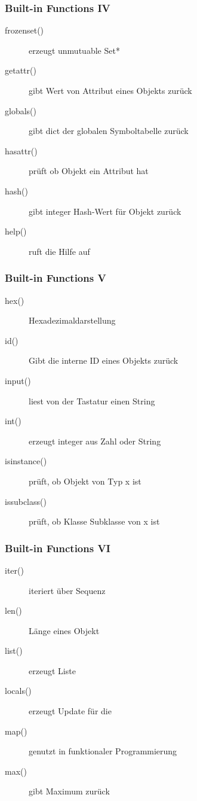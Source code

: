 \documentclass[ngerman]{beamer}
\begin{document}
\begin{frame}
\frametitle{Built-in Functions IV}

\begin{description}
\item[frozenset()] erzeugt unmutuable Set*
\item[getattr()] gibt Wert von Attribut eines Objekts zurück
\item[globals()] gibt dict der globalen Symboltabelle zurück
\item[hasattr()] prüft ob Objekt ein Attribut hat
\item[hash()] gibt integer Hash-Wert für Objekt zurück
\item[help()] ruft die Hilfe auf
\end{description}
\end{frame}


\begin{frame}
\frametitle{Built-in Functions V}

\begin{description}
\item[hex()] Hexadezimaldarstellung
\item[id()] Gibt die interne ID eines Objekts zurück
\item[input()] liest von der Tastatur einen String
\item[int()] erzeugt integer aus Zahl oder String
\item[isinstance()] prüft, ob Objekt von Typ x ist
\item[issubclass()] prüft, ob Klasse Subklasse von x ist
\end{description}
\end{frame}


\begin{frame}
\frametitle{Built-in Functions VI}

\begin{description}
\item[iter()] iteriert über Sequenz
\item[len()] Länge eines Objekt
\item[list()] erzeugt Liste
\item[locals()] erzeugt Update für die 
\item[map()] genutzt in funktionaler Programmierung
\item[max()] gibt Maximum zurück
\end{description}
\end{frame}
\end{document}

